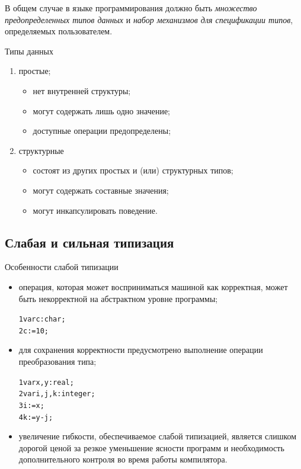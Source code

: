 \documentclass{beamer}
\begin{document}
\begin{frame}[c]
В общем случае в языке программирования должно быть \emph{множество предопределенных типов данных} и \emph{набор механизмов для спецификации типов}, определяемых пользователем.
\begin{block}{Типы данных}
\begin{enumerate}
\item простые;
	\begin{itemize}
	\item нет внутренней структуры;
	\item могут содержать лишь одно значение;
	\item доступные операции предопределены;	
	\end{itemize}
\item структурные
	\begin{itemize}
	\item состоят из других простых и (или) структурных типов;
	\item могут содержать составные значения;
	\item могут инкапсулировать поведение.	
	\end{itemize}
\end{enumerate}
\end{block}
\end{frame}   

\subsection{Слабая и сильная типизация}
\begin{frame}[fragile]
\begin{block}{Особенности слабой типизации}
\begin{itemize}
\item операция, которая может восприниматься машиной как корректная,
может быть некорректной на абстрактном уровне программы;
\begin{alltt}
1  var c: char;
2  c := 10;
\end{alltt}
\item для сохранения корректности предусмотрено выполнение операции преобразования типа;
\begin{alltt}
1  var x,y: real; 
2  var i,j,k: integer; 
3  i := x;
4  k := y - j;
\end{alltt}
\item увеличение гибкости, обеспечиваемое слабой типизацией, является слишком дорогой ценой за резкое уменьшение ясности программ и необходимость дополнительного контроля во время работы компилятора.	
\end{itemize}
\end{block}
\end{frame}   
\end{document}
